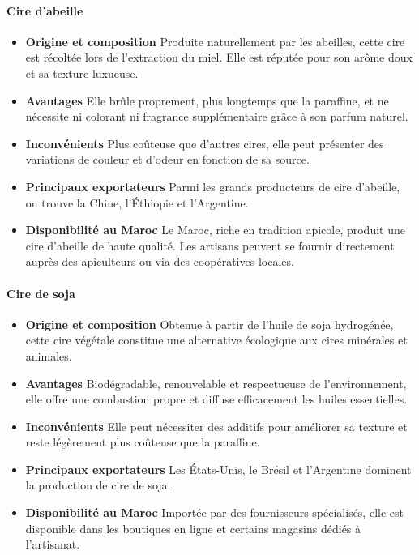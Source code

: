 \documentclass[11pt,fleqn,onecolumn,oneside]{book}
\begin{document}
\paragraph{Cire d’abeille}
\begin{itemize}
    \item \textbf{Origine et composition} Produite naturellement par les abeilles, cette cire est récoltée lors de l’extraction du miel. Elle est réputée pour son arôme doux et sa texture luxueuse.
    \item \textbf{Avantages} Elle brûle proprement, plus longtemps que la paraffine, et ne nécessite ni colorant ni fragrance supplémentaire grâce à son parfum naturel.
    \item \textbf{Inconvénients} Plus coûteuse que d’autres cires, elle peut présenter des variations de couleur et d’odeur en fonction de sa source.
    \item \textbf{Principaux exportateurs} Parmi les grands producteurs de cire d’abeille, on trouve la Chine, l’Éthiopie et l’Argentine.
    \item \textbf{Disponibilité au Maroc} Le Maroc, riche en tradition apicole, produit une cire d’abeille de haute qualité. Les artisans peuvent se fournir directement auprès des apiculteurs ou via des coopératives locales.
\end{itemize}

\paragraph{Cire de soja}
\begin{itemize}
    \item \textbf{Origine et composition} Obtenue à partir de l’huile de soja hydrogénée, cette cire végétale constitue une alternative écologique aux cires minérales et animales.
    \item \textbf{Avantages} Biodégradable, renouvelable et respectueuse de l’environnement, elle offre une combustion propre et diffuse efficacement les huiles essentielles.
    \item \textbf{Inconvénients} Elle peut nécessiter des additifs pour améliorer sa texture et reste légèrement plus coûteuse que la paraffine.
    \item \textbf{Principaux exportateurs} Les États-Unis, le Brésil et l’Argentine dominent la production de cire de soja.
    \item \textbf{Disponibilité au Maroc} Importée par des fournisseurs spécialisés, elle est disponible dans les boutiques en ligne et certains magasins dédiés à l’artisanat.
\end{itemize}
\end{document}
